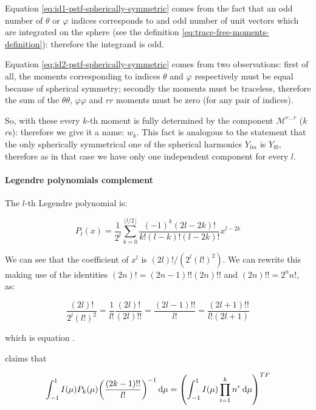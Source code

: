 \documentclass[main.tex]{subfiles}
\begin{document}
Equation \eqref{eq:id1-pstf-spherically-symmetric}  comes from the fact that an odd number of \(\theta\) or \(\varphi\) indices corresponds to and odd number of unit vectors which are integrated on the sphere (see the definition \eqref{eq:trace-free-moments-definition}): therefore the integrand is odd.

Equation \eqref{eq:id2-pstf-spherically-symmetric} comes from two observations:
first of all, the moments corresponding to indices \(\theta\) and \(\varphi\) respectively must be equal because of spherical symmetry; secondly the moments must be traceless, therefore the sum of the \(\theta \theta\), \(\varphi \varphi\) and \(rr\) moments must be zero (for any pair of indices).

So, with these every \(k\)-th moment is fully determined by the component \(\mathscr M ^{r\dots r}\) (\(k\) \(r\)s): therefore we give it a name: \(w_k\).
This fact is analogous to the statement that the only spherically symmetrical one of the spherical harmonics \(Y_{lm}\) is \(Y_{l0}\), therefore as in that case we have only one independent component for every \(l\).

\paragraph{Legendre polynomials complement}

The \(l\)-th Legendre polynomial is:

\begin{equation} \label{eq:legendre-polynomials}
    P_{l}(x)=\frac{1}{2^{l}} \sum_{k=0}^{\lfloor l / 2\rfloor} \frac{(-1)^{k}(2 l-2 k) !}{k !(l-k) !(l-2 k) !} x^{l-2 k}
\end{equation}

We can see that the coefficient of \(x^l\) is \((2l)! / (2^l (l!)^2)\). We can rewrite this making use of the identities \((2n)! = (2n-1)!! (2n)!!\) and \((2n)!! = 2^n n!\),  as:

\begin{equation}
    \frac{(2l)!}{2^l (l!)^2} = \frac{1}{l!} \frac{(2l)!}{(2l)!!} = \frac{(2l-1)!!}{l!} = \frac{(2l+1)!!}{l! (2l+1)}
\end{equation}

which is equation \cite[eq. 5.7d]{Thorne:1981feb}.

\textcite[eqs. 5.6]{Thorne:1981feb} claims that

\begin{equation} \label{eq:thorne-trace-free-integral-claim}
    \int_{-1}^1 I(\mu) P_k(\mu) \qty(\frac{(2k-1)!!}{l!})^{-1} \dd{\mu} = \qty(\int_{-1}^1  I(\mu) \prod_{i=1}^k n^r \dd{\mu})^{TF}
\end{equation}
\end{document}
